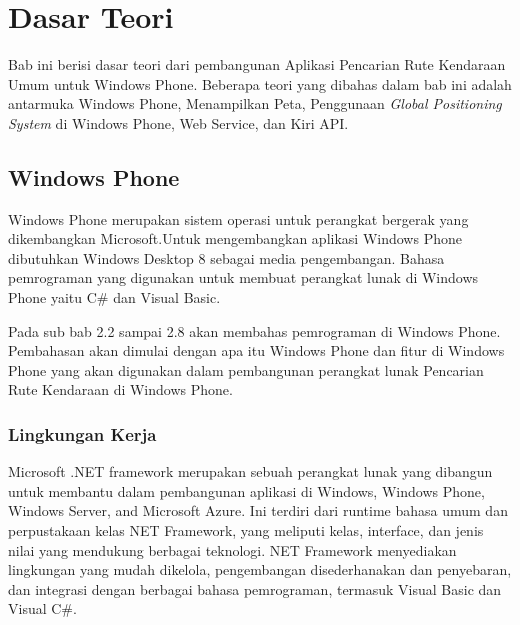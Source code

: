 \chapter{Dasar Teori}
\label{chap:teori}
Bab ini berisi dasar teori dari pembangunan Aplikasi Pencarian Rute Kendaraan Umum untuk Windows Phone. Beberapa teori yang dibahas dalam bab ini  adalah antarmuka Windows Phone, Menampilkan Peta, Penggunaan \textit{Global Positioning System} di Windows Phone, Web Service, dan Kiri API. 

\section{Windows Phone}
\label{sec:Windows Phone}
\hspace{0.5cm} Windows Phone merupakan sistem operasi untuk perangkat bergerak yang dikembangkan Microsoft.\footnotemark[1] Untuk mengembangkan aplikasi Windows Phone dibutuhkan Windows Desktop 8 sebagai media pengembangan. Bahasa pemrograman yang digunakan untuk membuat perangkat lunak di Windows Phone yaitu C\# dan Visual Basic.  

\hspace{0.5cm} Pada sub bab 2.2 sampai 2.8 akan membahas pemrograman di Windows Phone. Pembahasan akan dimulai dengan apa itu Windows Phone dan fitur di Windows Phone yang akan digunakan dalam pembangunan perangkat lunak Pencarian Rute Kendaraan di Windows Phone. 

\subsection{Lingkungan Kerja}
\label{subsec:Lingkungan Kerja}
\hspace{0.5cm} Microsoft .NET framework merupakan sebuah perangkat lunak yang dibangun untuk membantu dalam pembangunan aplikasi di Windows, Windows Phone, Windows Server, and Microsoft Azure\cite{MSDN}. Ini terdiri dari runtime bahasa umum dan perpustakaan kelas NET Framework, yang meliputi kelas, interface, dan jenis nilai yang mendukung berbagai teknologi. NET Framework menyediakan lingkungan yang mudah dikelola, pengembangan disederhanakan dan penyebaran, dan integrasi dengan berbagai bahasa pemrograman, termasuk Visual Basic dan Visual C\#.


